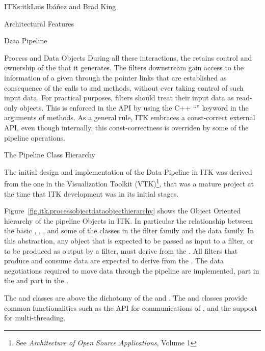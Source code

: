 \begin{aosachapter}{ITK}{s:itk}{Luis Ib\'{a}\~{n}ez and Brad King}
\begin{aosasect1}{Architectural Features}
\begin{aosasect2}{Data Pipeline}
\begin{aosasect3}{Process and Data Objects}
During all these interactions, the  retains
control and ownership of the  that it generates.
The filters downstream gain access to the information of a given
 through the pointer links that are established
as consequence of the calls to  and
 methods, without ever taking control of such
input data. For practical purposes, filters should treat their
input data as read-only objects. This is enforced in the API by
using the C++ ``'' keyword in the arguments of
 methods. As a general rule, ITK embraces a
const-correct external API, even though internally, this
const-correctness is overriden by some of the pipeline operations.


\end{aosasect3}

\begin{aosasect3}{The Pipeline Class Hierarchy}

The initial design and implementation of the Data Pipeline in ITK was derived
from the one in the Visualization Toolkit (VTK)\footnote{See \emph{Architecture
of Open Source Applications}, Volume 1}, that was a mature project at the time
that ITK development was in its initial stages.

Figure~\ref{fig.itk.processobjectdataobjecthierarchy} shows the Object Oriented
hierarchy of the pipeline Objects in ITK. In particular the relationship
between the basic , , , and
some of the classes in the filter family and the data family. In this
abstraction, any object that is expected to be passed as input to a filter, or
to be produced as output by a filter, must derive from the . All
filters that produce and consume data are expected to derive from the
. The data negotiations required to move data through the
pipeline are implemented, part in the  and part in the
.


The  and  classes are above the
dichotomy of the  and . The
 and  classes provide common
functionalities such as the API for communications of ,
and the support for multi-threading.


\end{aosasect3}
\end{aosasect2}
\end{aosasect1}
\end{aosachapter}
